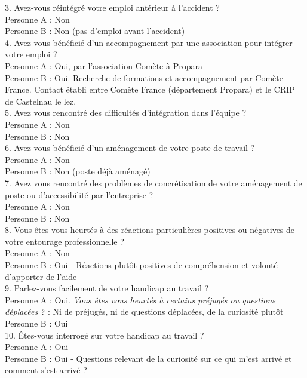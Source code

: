 3. Avez-vous réintégré votre emploi antérieur à l’accident ?\\
Personne A : Non \\
Personne B : Non (pas d'emploi avant l'accident)\\


4. Avez-vous bénéficié d’un accompagnement par une association pour intégrer votre emploi ? \\
Personne A : Oui, par l'association Comète à Propara\\
Personne B : Oui. Recherche de formations et accompagnement par Comète France. Contact établi entre Comète France (département Propara) et le CRIP de Castelnau le lez. \\


5. Avez vous rencontré des difficultés d’intégration dans l’équipe ?\\
Personne A : Non \\
Personne B : Non \\


6. Avez-vous bénéficié d’un aménagement de votre poste de travail ? \\
Personne A : Non \\
Personne B : Non (poste déjà aménagé) \\


7. Avez vous rencontré des problèmes de concrétisation de votre aménagement de poste ou d'accessibilité par l'entreprise ?\\
Personne A : Non \\
Personne B : Non \\




8. Vous êtes vous heurtés à des réactions particulières positives ou négatives de votre entourage professionnelle ?\\
Personne A : Non \\
Personne B : Oui - Réactions plutôt positives de compréhension et volonté d’apporter de l’aide\\


9. Parlez-vous facilement de votre handicap au travail ?\\
Personne A : Oui. \textit{Vous êtes vous heurtés à certains préjugés ou questions déplacées ? } : Ni de préjugés, ni de questions déplacées, de la curiosité plutôt\\
Personne B : Oui \\


10. Êtes-vous interrogé sur votre handicap au travail ?\\
Personne A : Oui\\
Personne B : Oui - Questions relevant de la curiosité sur ce qui m’est arrivé et comment s’est arrivé ?\\



